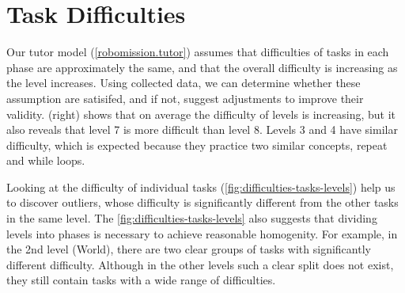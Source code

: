 \section{Task Difficulties}


Our tutor model (\cref{robomission.tutor}) assumes that difficulties of tasks
in each phase are approximately the same,
and that the overall difficulty is increasing as the level increases.   %
Using collected data, we can determine whether these assumption are satisifed,
and if not, suggest adjustments to improve their validity.
 (right) shows that on average the difficulty of levels
is increasing, but it also reveals that level 7 is more difficult than level 8.
Levels 3 and 4 have similar difficulty, which is expected because they practice
two similar concepts, repeat and while loops.

Looking at the difficulty of individual tasks (\cref{fig:difficulties-tasks-levels})
help us to discover outliers, whose difficulty is significantly
different from the other tasks in the same level.
The \cref{fig:difficulties-tasks-levels} also suggests that dividing levels
into phases is necessary to achieve reasonable homogenity. For example, in the 2nd
level (World), there are two clear groups of tasks with significantly different
difficulty. Although in the other levels such a clear split does not exist,
they still contain tasks with a wide range of difficulties. %

